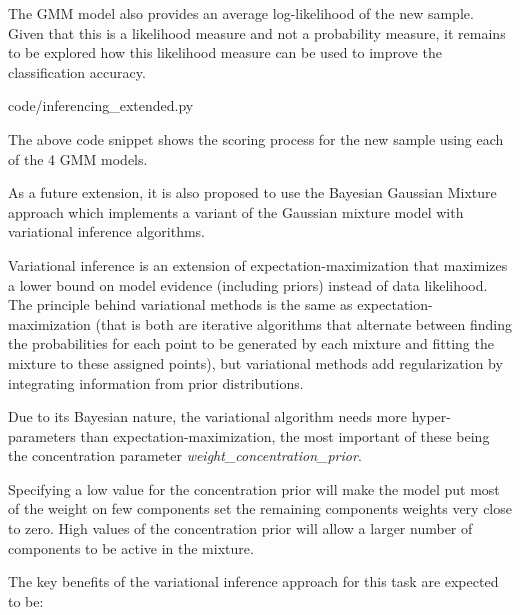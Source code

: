 \documentclass[a4paper,twoside,12pt]{report}
\begin{document}
The GMM model also provides an average log-likelihood of the new sample.   Given that this is a likelihood measure and not a probability measure, it remains to be explored how this likelihood measure can be used to improve the classification accuracy. 


{code/inferencing_extended.py}

The above code snippet shows the scoring process for the new sample using each of the 4 GMM models. 

As a future extension, it is also proposed to use the Bayesian Gaussian Mixture approach which  implements a variant of the Gaussian mixture model with variational inference algorithms.

Variational inference is an extension of expectation-maximization that maximizes a lower bound on model evidence (including priors) instead of data likelihood. The principle behind variational methods is the same as expectation-maximization (that is both are iterative algorithms that alternate between finding the probabilities for each point to be generated by each mixture and fitting the mixture to these assigned points), but variational methods add regularization by integrating information from prior distributions. 

Due to its Bayesian nature, the variational algorithm needs more hyper-parameters than expectation-maximization, the most important of these being the concentration parameter \emph{weight\_concentration\_prior}. 

Specifying a low value for the concentration prior will make the model put most of the weight on few components set the remaining components weights very close to zero. High values of the concentration prior will allow a larger number of components to be active in the mixture.

The key benefits of the variational inference approach for this task are expected to be: 
\end{document}
